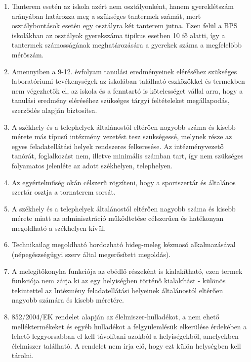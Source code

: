 \documentclass{article}
\providecommand{\tightlist}{%
  \setlength{\itemsep}{0pt}\setlength{\parskip}{0pt}}
\begin{document}
\begin{enumerate}
\def\labelenumi{\arabic{enumi}.}
\tightlist
\item
  Tanterem esetén az iskola azért nem osztályonként, hanem gyereklétszám
  arányában határozza meg a szükséges tantermek számát, mert
  osztálybontások esetén egy osztályra két tanterem jutna. Ezen felül a
  BPS iskolákban az osztályok gyerekszáma tipikus esetben 10 fő alatti,
  így a tantermek számosságának meghatározására a gyerekek száma a
  megfelelőbb mérőszám.
\item
  Amennyiben a 9-12. évfolyam tanulási eredményeinek eléréséhez
  szükséges laboratóriumi tevékenységek az iskolában található
  eszközökkel és termekben nem végezhetők el, az iskola és a fenntartó
  is kötelességet vállal arra, hogy a tanulási eredmény eléréséhez
  szükséges tárgyi feltételeket megállapodás, szerződés alapján
  biztosítsa.
\item
  A székhely és a telephelyek általánostól eltérően nagyobb száma és
  kisebb mérete más típusú intézmény vezetést tesz szükségessé, melynek
  része az egyes feladatellátási helyek rendszeres felkeresése. Az
  intézményvezető tanórát, foglalkozást nem, illetve minimális számban
  tart, így nem szükséges folyamatos jelenléte az adott székhelyen,
  telephelyen.
\item
  Az egyértelműség okán célszerű rögzíteni, hogy a sportszertár és
  általános szertár osztja a tornaterem sorsát.
\item
  A székhely és a telephelyek általánostól eltérően nagyobb száma és
  kisebb mérete miatt az adminisztráció működtetése célszerűen és
  hatékonyan megoldható a székhelyen kívül.
\item
  Technikailag megoldható hordozható hideg-meleg kézmosó alkalmazásával
  (népegészségügyi szerv által megerősített megoldás).
\item
  A melegítőkonyha funkciója az ebédlő részeként is kialakítható, ezen
  termek funkciója nem zárja ki az egy helyiségben történő kialakítást -
  különös tekintettel az Intézmény feladatellátási helyeinek
  általánostól eltérően nagyobb számára és kisebb méretére.
\item
  852/2004/EK rendelet alapján az élelmiszer-hulladékot, a nem ehető
  melléktermékeket és egyéb hulladékot a felgyülemlésük elkerülése
  érdekében a lehető leggyorsabban el kell távolítani azokból a
  helyiségekből, amelyekben élelmiszer található. A rendelet nem írja
  elő, hogy ezt külön helységben kell tárolni.
\end{enumerate}
\end{document}
